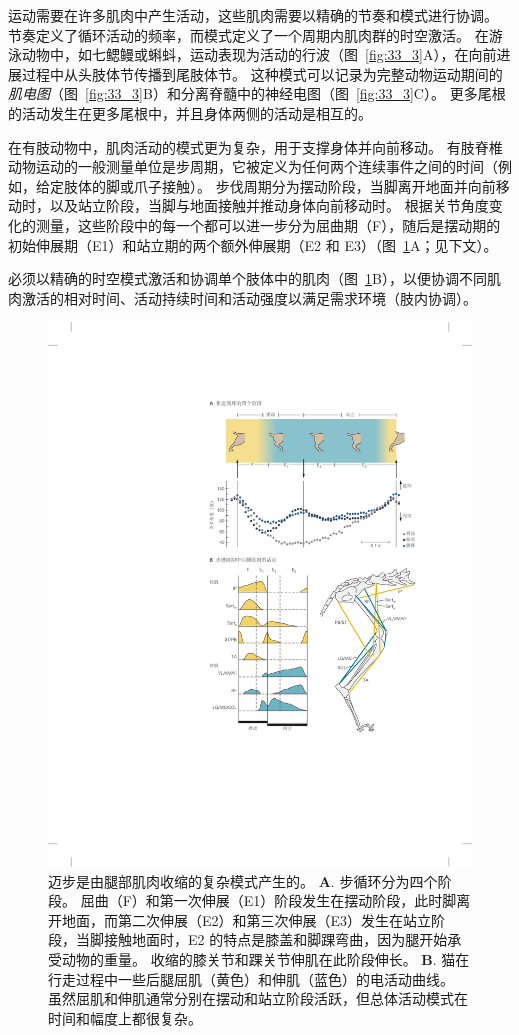 运动需要在许多肌肉中产生活动，这些肌肉需要以精确的节奏和模式进行协调。
节奏定义了循环活动的频率，而模式定义了一个周期内肌肉群的时空激活。
在游泳动物中，如七鳃鳗或蝌蚪，运动表现为活动的行波（图~\ref{fig:33_3}A），在向前进展过程中从头肢体节传播到尾肢体节。
这种模式可以记录为完整动物运动期间的\textit{肌电图}（图~\ref{fig:33_3}B）和分离脊髓中的神经电图（图~\ref{fig:33_3}C）。
更多尾根的活动发生在更多尾根中，并且身体两侧的活动是相互的。


在有肢动物中，肌肉活动的模式更为复杂，用于支撑身体并向前移动。
有肢脊椎动物运动的一般测量单位是步周期，它被定义为任何两个连续事件之间的时间（例如，给定肢体的脚或爪子接触）。
步伐周期分为摆动阶段，当脚离开地面并向前移动时，以及站立阶段，当脚与地面接触并推动身体向前移动时。
根据关节角度变化的测量，这些阶段中的每一个都可以进一步分为屈曲期（F），随后是摆动期的初始伸展期（E1）和站立期的两个额外伸展期（E2 和 E3）（图~\ref{fig:33_4}A；见下文）。


必须以精确的时空模式激活和协调单个肢体中的肌肉（图~\ref{fig:33_4}B），以便协调不同肌肉激活的相对时间、活动持续时间和活动强度以满足需求环境（肢内协调）。


\begin{figure}[htbp]
	\centering
	\includegraphics[width=0.8\linewidth]{chap33/fig_33_4}
	\caption{迈步是由腿部肌肉收缩的复杂模式产生的。
	\textbf{A}. 步循环分为四个阶段。
	屈曲（F）和第一次伸展（E1）阶段发生在摆动阶段，此时脚离开地面，而第二次伸展（E2）和第三次伸展（E3）发生在站立阶段，当脚接触地面时，E2 的特点是膝盖和脚踝弯曲，因为腿开始承受动物的重量。
	收缩的膝关节和踝关节伸肌在此阶段伸长\cite{engberg1969electromyographic}。
	\textbf{B}. 猫在行走过程中一些后腿屈肌（黄色）和伸肌（蓝色）的电活动曲线。
	虽然屈肌和伸肌通常分别在摆动和站立阶段活跃，但总体活动模式在时间和幅度上都很复杂。}
	\label{fig:33_4}
\end{figure}


